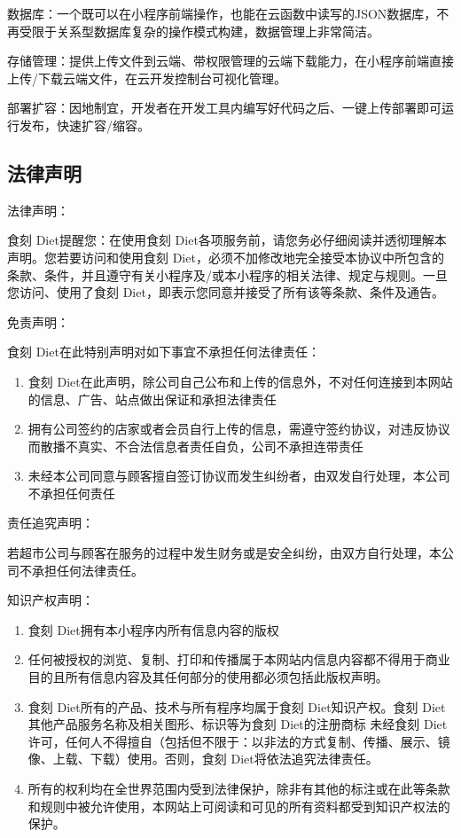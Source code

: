 \documentclass[UTF8,12pt]{ctexart}
\numberwithin{figure}{section}%
\begin{document}
\begin{spacing}{2}
数据库：一个既可以在小程序前端操作，也能在云函数中读写的JSON数据库，不再受限于关系型数据库复杂的操作模式构建，数据管理上非常简洁。

存储管理：提供上传文件到云端、带权限管理的云端下载能力，在小程序前端直接上传/下载云端文件，在云开发控制台可视化管理。

部署扩容：因地制宜，开发者在开发工具内编写好代码之后、一键上传部署即可运行发布，快速扩容/缩容。

\subsection{法律声明}

法律声明：

食刻 Diet提醒您：在使用食刻 Diet各项服务前，请您务必仔细阅读并透彻理解本声明。您若要访问和使用食刻 Diet，必须不加修改地完全接受本协议中所包含的条款、条件，并且遵守有关小程序及/或本小程序的相关法律、规定与规则。一旦您访问、使用了食刻 Diet，即表示您同意并接受了所有该等条款、条件及通告。

免责声明：

食刻 Diet在此特别声明对如下事宜不承担任何法律责任：

\begin{enumerate}
	\item[(1)]食刻 Diet在此声明，除公司自己公布和上传的信息外，不对任何连接到本网站的信息、广告、站点做出保证和承担法律责任
	
	\item[(2)]拥有公司签约的店家或者会员自行上传的信息，需遵守签约协议，对违反协议而散播不真实、不合法信息者责任自负，公司不承担连带责任
	
	\item[(3)]未经本公司同意与顾客擅自签订协议而发生纠纷者，由双发自行处理，本公司不承担任何责任
	
\end{enumerate}

责任追究声明：

若超市公司与顾客在服务的过程中发生财务或是安全纠纷，由双方自行处理，本公司不承担任何法律责任。

知识产权声明：

\begin{enumerate}
	\item[(1)]食刻 Diet拥有本小程序内所有信息内容的版权	
	\item[(2)]任何被授权的浏览、复制、打印和传播属于本网站内信息内容都不得用于商业目的且所有信息内容及其任何部分的使用都必须包括此版权声明。	
	\item[(3)]食刻 Diet所有的产品、技术与所有程序均属于食刻 Diet知识产权。食刻 Diet其他产品服务名称及相关图形、标识等为食刻 Diet的注册商标
	未经食刻 Diet许可，任何人不得擅自（包括但不限于：以非法的方式复制、传播、展示、镜像、上载、下载）使用。否则，食刻 Diet将依法追究法律责任。
	\item[(4)]所有的权利均在全世界范围内受到法律保护，除非有其他的标注或在此等条款和规则中被允许使用，本网站上可阅读和可见的所有资料都受到知识产权法的保护。
	

\end{enumerate}
\end{spacing}
\end{document}
